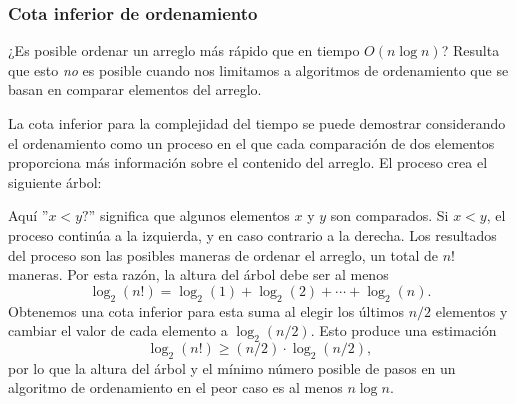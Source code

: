 \subsubsection{Cota inferior de ordenamiento}

¿Es posible ordenar un arreglo más rápido
que en tiempo $O(n \log n)$?
Resulta que esto \emph{no} es posible
cuando nos limitamos a algoritmos de ordenamiento
que se basan en comparar elementos del arreglo.

La cota inferior para la complejidad del tiempo
se puede demostrar considerando el ordenamiento
como un proceso en el que cada comparación de dos elementos
proporciona más información sobre el contenido del arreglo.
El proceso crea el siguiente árbol:

\begin{center}
\end{center}

Aquí ''$x<y?$'' significa que algunos elementos
$x$ y $y$ son comparados.
Si $x<y$, el proceso continúa a la izquierda,
y en caso contrario a la derecha.
Los resultados del proceso son las posibles
maneras de ordenar el arreglo, un total de $n!$ maneras.
Por esta razón, la altura del árbol
debe ser al menos
\[ \log_2(n!) = \log_2(1)+\log_2(2)+\cdots+\log_2(n).\]
Obtenemos una cota inferior para esta suma
al elegir los últimos $n/2$ elementos y
cambiar el valor de cada elemento a $\log_2(n/2)$.
Esto produce una estimación
\[ \log_2(n!) \ge (n/2) \cdot \log_2(n/2),\]
por lo que la altura del árbol y el mínimo
número posible de pasos en un algoritmo de ordenamiento
en el peor caso
es al menos $n \log n$.

